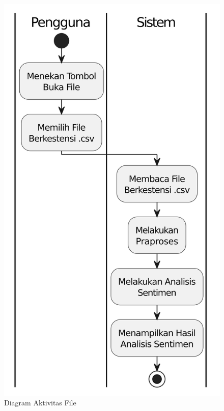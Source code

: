\begin{figure}[H]
  \centering
  \includegraphics[scale=0.7]{assets/activity_diagram_file.png}
  \caption{Diagram Aktivitas File}
  \label{fig:activity_diagram_file}
\end{figure}

